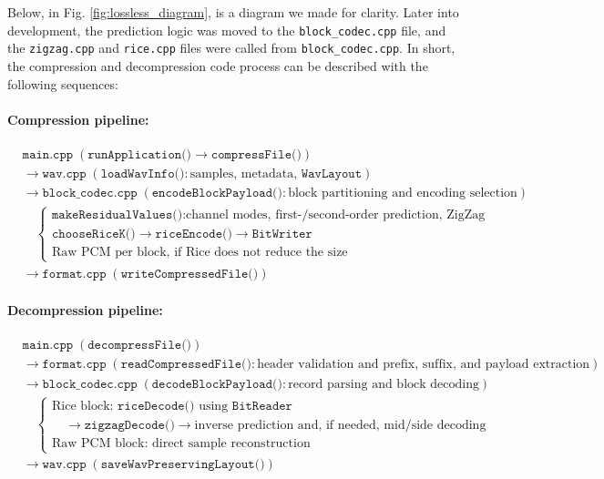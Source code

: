 Below, in Fig. \ref{fig:lossless_diagram}, is a diagram we made for clarity. Later into development, the prediction logic was moved to the \texttt{block\_codec.cpp} file, and the \texttt{zigzag.cpp} and \texttt{rice.cpp} files were called from \texttt{block\_codec.cpp}. In short, the compression and decompression code process can be described with the following sequences:

\paragraph{Compression pipeline:}
\[
\begin{aligned}
&\texttt{main.cpp} \; (\texttt{runApplication()} \to \texttt{compressFile()})\\
&\to \texttt{wav.cpp} \; (\texttt{loadWavInfo()}: \text{samples, metadata, } \texttt{WavLayout})\\
&\to \texttt{block\_codec.cpp} \; (\texttt{encodeBlockPayload()}: \text{block partitioning and encoding selection})\\
&\quad \begin{cases}
\texttt{makeResidualValues()}: \text{channel modes, first-/second-order prediction, ZigZag}\\
\texttt{chooseRiceK()} \to \texttt{riceEncode()} \to \texttt{BitWriter}\\
\text{Raw PCM per block, if Rice does not reduce the size}
\end{cases}\\
&\to \texttt{format.cpp} \; (\texttt{writeCompressedFile()})
\end{aligned}
\]

\paragraph{Decompression pipeline:}
\[
\begin{aligned}
&\texttt{main.cpp} \; (\texttt{decompressFile()})\\
&\to \texttt{format.cpp} \; (\texttt{readCompressedFile()}: \text{header validation and prefix, suffix, and payload extraction})\\
&\to \texttt{block\_codec.cpp} \; (\texttt{decodeBlockPayload()}: \text{record parsing and block decoding})\\
&\quad \begin{cases}
\text{Rice block: } \texttt{riceDecode()} \text{ using } \texttt{BitReader}\\
\quad \to \texttt{zigzagDecode()} \to \text{inverse prediction and, if needed, mid/side decoding}\\
\text{Raw PCM block: direct sample reconstruction}
\end{cases}\\
&\to \texttt{wav.cpp} \; (\texttt{saveWavPreservingLayout()})
\end{aligned}
\]

